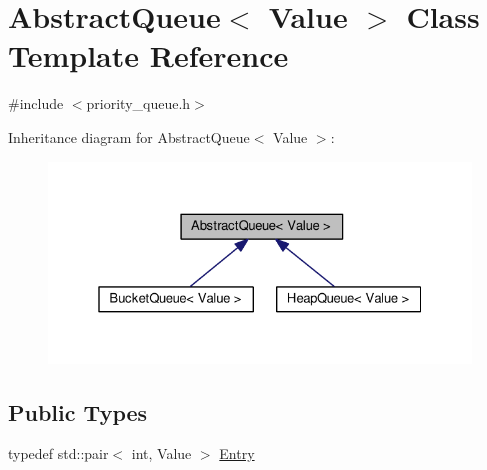 \hypertarget{classAbstractQueue}{\section{Abstract\-Queue$<$ Value $>$ Class Template Reference}
\label{classAbstractQueue}
}


{\ttfamily \#include $<$priority\-\_\-queue.\-h$>$}



Inheritance diagram for Abstract\-Queue$<$ Value $>$\-:
\nopagebreak
\begin{figure}[H]
\begin{center}
\leavevmode
\includegraphics[width=327pt]{classAbstractQueue__inherit__graph}
\end{center}
\end{figure}
\subsection*{Public Types}
\begin{DoxyCompactItemize}
\item 
typedef std\-::pair$<$ int, Value $>$ \hyperlink{classAbstractQueue_abe60381528bc4cf9d4032f33f2ff6f3c}{Entry}
\end{DoxyCompactItemize}
